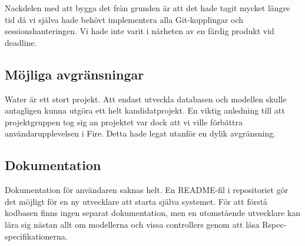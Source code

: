Nackdelen med att bygga det från grunden är att det hade tagit mycket längre tid då vi själva hade behövt implementera alla Git-kopplingar och sessionshanteringen. Vi hade inte varit i närheten av en färdig produkt vid deadline.

\subsection{Möjliga avgränsningar}
Water är ett stort projekt. Att endast utveckla databasen och modellen skulle antagligen kunna utgöra ett helt kandidatprojekt. En viktig anledning till att projektgruppen tog sig an projektet var dock att vi ville förbättra användarupplevelsen i Fire. Detta hade legat utanför en dylik avgränsning.

\subsection{Dokumentation}
Dokumentation för användaren saknas helt. En README-fil i repositoriet gör det möjligt för en ny utvecklare att starta själva systemet. För att förstå kodbasen finns ingen separat dokumentation, men en utomstående utvecklare kan lära sig nästan allt om modellerna och vissa controllers genom att läsa Rspec-specifikationerna.
